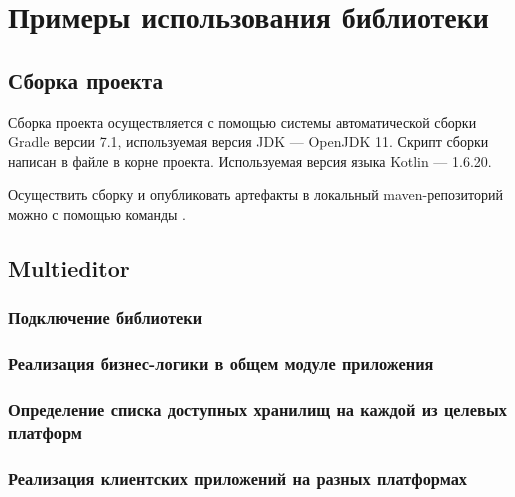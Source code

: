 \section{Примеры использования библиотеки}\label{usage-examples}

\subsection{Сборка проекта}
    Сборка проекта осуществляется с помощью системы автоматической сборки Gradle\cite{gradle} версии 7.1, используемая версия JDK --- OpenJDK 11. Скрипт сборки написан в файле  в корне проекта. Используемая версия языка Kotlin --- 1.6.20.

    Осуществить сборку и опубликовать артефакты в локальный maven-репозиторий можно с помощью команды .

\subsection{Multieditor}
    \subsubsection{Подключение библиотеки}

    \subsubsection{Реализация бизнес-логики в общем модуле приложения}
    \subsubsection{Определение списка доступных хранилищ на каждой из целевых платформ}
    \subsubsection{Реализация клиентских приложений на разных платформах}
        \paragraph{}

